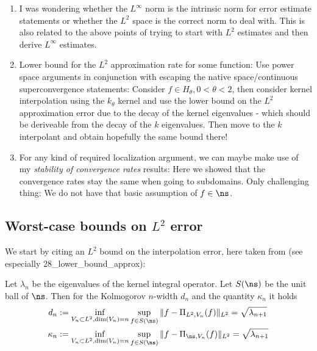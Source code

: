 \documentclass[a4paper, 10pt]{article}
\begin{document}
\begin{enumerate}
\begin{enumerate}
It think so far I only analyzed the $L^\infty$ convergence rates.
\end{enumerate}
\item I was wondering whether the $L^\infty$ norm is the intrinsic norm for error estimate statements or whether the $L^2$ space is the correct norm to deal with. 
This is also related to the above points of trying to start with $L^2$ estimates and then derive $L^\infty$ estimates.
\item Lower bound for the $L^2$ approximation rate for some function:
Use power space arguments in conjunction with escaping the native space/continuous superconvergence statements: 
Consider $f \in H_\theta, 0 < \theta < 2$, then consider kernel interpolation using the $k_\theta$ kernel and use the lower bound on the $L^2$ approximation error due to the decay of the kernel eigenvalues - which should be deriveable from the decay of the $k$ eigenvalues.
Then move to the $k$ interpolant and obtain hopefully the same bound there!
\item For any kind of required localization argument, we can maybe make use of my \textit{stability of convergence rates} results:
Here we showed that the convergence rates stay the same when going to subdomains.
Only challenging thing: We do not have that basic assumption of $f \in \ns$.
\end{enumerate}

\subsection{Worst-case bounds on $L^2$ error}


We start by citing an $L^2$ bound on the interpolation error, here taken from \cite[Section 3]{santin2016approximation} (see especially 28\_lower\_bound\_approx):

\begin{theorem}
\label{th:bounds_kolmogorov_width}
Let $\lambda_n$ be the eigenvalues of the kernel integral operator.
Let $S(\ns)$ be the unit ball of $\ns$.
Then for the Kolmogorov $n$-width $d_n$ and the quantity $\kappa_n$ it holds
\begin{align*}
d_n &:= \inf_{V_n \subset L^2, \dim(V_n)=n} \sup_{f \in S(\ns)} \Vert f - \Pi_{L^2, V_n}(f) \Vert_{L^2} = \sqrt{\lambda_{n+1}} \\
\kappa_n &:= \inf_{V_n \subset L^2, \dim(V_n)=n} \sup_{f \in S(\ns)} \Vert f - \Pi_{\ns, V_n}(f) \Vert_{L^2} = \sqrt{\lambda_{n+1}}
\end{align*}
\end{theorem}
\end{document}
